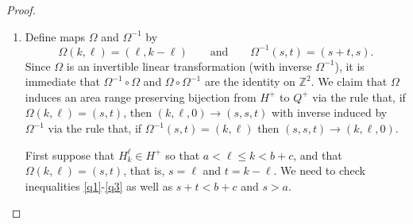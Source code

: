 \documentclass[11pt,reqno]{amsart}
\newcommand{\mms}{_}
\theoremstyle{definition}
\numberwithin{equation}{section}
\begin{document}
\begin{proof}
\begin{enumerate}
\begin{itemize}
\item $\delta_{ij} - \epsilon_{ij} \leqslant 0$.  This reduces to $i-\epsilon_{ij} \leqslant a$ which says that 
$s-\omega_{st}-\max(0,s+t+\omega_{st}-(b+c)) \leqslant a$.  Since $s+t \geqslant b+c$, this is equivalent to 
$-t-2\omega_{st} \leqslant a-b-c$.  If $\omega_{st}=0$ then $2s+t \leqslant L$ and which we may add to 
$-2s-2t\leqslant -2b-2c$ to get $-t \leqslant a-b-c$ as desired.  If $\omega_{st}>0$ then it will suffice to show 
$-t-2\frac{2s+t-L}{2} \leqslant a-b-c$ but this reduces to $-2s-2t \leqslant -2b-2c$.

 \item $i+j>b+c$.  This means $s+t+\omega_{st}>b+c$.  If $\omega_{st}>0$ this follows from $s+t \geqslant b+c$.  
 Now suppose $\omega_{st}=0$. Then $2s+t \leqslant L$ which we may add to $-s-t \leqslant -b-c$ to get $s \leqslant a$.  
 Thus the assumptions $s+t \geqslant b+c$ and $(s+t=b+c) \implies s>a$ reveal that $s+t>b+c$.
\end{itemize}

This proves that $\Phi$ induces a bijection from $P_>^-$ to $Q_>^-$. Moreover if $P_{ij} \in P_>^-$, then 
$\delta_{ij}\leqslant \epsilon_{ij}$ and $i+j > b+c$, so the area range reduces to $R_{ij}=[2i+j-(b+c),A-2i-j]$.  
Now if $\Phi(i,j)=(s,t)$, then since by the above $Q\mms{st} \in Q_>^-$ we have $s+t \geqslant b+c$ so that we 
get $R\mms{st} = [2s+t-(b+c),A-2s-t]$.  Since it is clear that $2i+j=2s+t$ we see that $R_{ij}=R\mms{st}$ and so the 
bijection induced by $\Phi$ preserves the area range.


\item Define maps $\Omega$ and $\Omega^{-1}$ by
\[
	 \Omega(k,\ell)=(\ell,k-\ell) \qquad \text{and} \qquad  \Omega^{-1}(s,t)=(s+t,s).
\]
Since $\Omega$ is an invertible linear transformation (with inverse $\Omega^{-1}$), it is immediate that 
$\Omega^{-1} \circ \Omega$ and $\Omega \circ \Omega^{-1}$ are the identity on $\mathbb{Z}^2$.  We 
claim that $\Omega$ induces an area range preserving bijection from $H^+$ to $Q^+$ via the rule that, if 
$\Omega(k,\ell)=(s,t)$, then $(k,\ell,0) \rightarrow (s,s,t)$ with inverse  induced by $\Omega^{-1}$  via the rule that,
if  $\Omega^{-1}(s,t)=(k,\ell)$ then $(s,s,t) \rightarrow (k,\ell,0)$.

First suppose that $H_k^\ell \in H^+$ so that $a < \ell \leqslant k <b+c$, and that $\Omega(k,\ell)=(s,t)$, that is, 
$s=\ell$ and $t=k-\ell$. We need to check inequalities \eqref{q1}-\eqref{q3} as well as $s+t<b+c$ and $s>a$.


\end{enumerate}
\end{proof}
\end{document}
